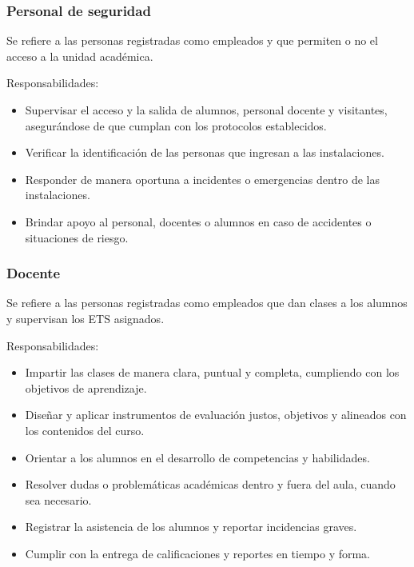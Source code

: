 \begin{Usuario}{\hypertarget{tPersonalSeguridad}{\subsubsection{Personal de seguridad}}}{
    Se refiere a las personas registradas como empleados y que permiten o no el acceso a la unidad académica.
}


\item[Responsabilidades:] \cdtEmpty
\begin{itemize}
    \item Supervisar el acceso y la salida de alumnos, personal docente y visitantes, asegurándose de que cumplan con los protocolos establecidos.
    \item Verificar la identificación de las personas que ingresan a las instalaciones.
    \item Responder de manera oportuna a incidentes o emergencias dentro de las instalaciones.
    \item Brindar apoyo al personal, docentes o alumnos en caso de accidentes o situaciones de riesgo.
\end{itemize}
\end{Usuario}

\begin{Usuario}{\hypertarget{tDocenteAplicador}{\subsubsection{Docente}}}{
    Se refiere a las personas registradas como empleados que dan clases a los alumnos y supervisan los ETS asignados.
}


\item[Responsabilidades:] \cdtEmpty
\begin{itemize}
    \item Impartir las clases de manera clara, puntual y completa, cumpliendo con los objetivos de aprendizaje.
    \item Diseñar y aplicar instrumentos de evaluación justos, objetivos y alineados con los contenidos del curso.
    \item Orientar a los alumnos en el desarrollo de competencias y habilidades.
    \item Resolver dudas o problemáticas académicas dentro y fuera del aula, cuando sea necesario.
    \item Registrar la asistencia de los alumnos y reportar incidencias graves.
    \item Cumplir con la entrega de calificaciones y reportes en tiempo y forma.
\end{itemize}
\end{Usuario}

